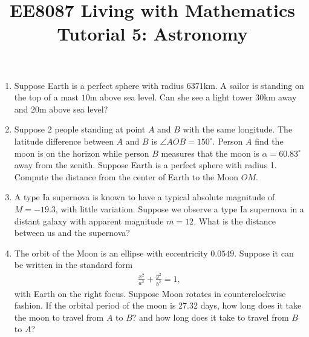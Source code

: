 \documentclass{article}
\title{EE8087 Living with Mathematics\\Tutorial 5: Astronomy}
\date{}
\begin{document}
 \maketitle
\begin{enumerate}
\item Suppose Earth is a perfect sphere with radius $6371$km. A sailor is standing on the top of a mast $10$m above sea level. Can she see a light tower $30$km away and $20$m above sea level?


\item Suppose 2 people standing at point $A$ and $B$ with the same longitude. The latitude difference between $A$ and $B$ is $\angle AOB = 150^\circ$. Person $A$ find the moon is on the horizon while person $B$ measures that the moon is $\alpha = 60.83^\circ$ away from the zenith. Suppose Earth is a perfect sphere with radius 1. Compute the distance from the center of Earth to the Moon $OM$.
\begin{figure}[ht]
  \centering
\end{figure}
\item A type Ia supernova is known to have a typical absolute magnitude of $M = -19.3$, with little variation. Suppose we observe a type Ia supernova in a distant galaxy with apparent magnitude $m=12$. What is the distance between us and the supernova?
\item  The orbit of the Moon is an ellipse with eccentricity $0.0549$. Suppose it can be written in the standard form
  \begin{align*}
    \frac{x^2}{a^2}+\frac{y^2}{b^2} = 1,
  \end{align*}
   with Earth on the right focus. Suppose Moon rotates in counterclockwise fashion. If the orbital period of the moon is 27.32 days, how long does it take the moon to travel from $A$ to $B$? and how long does it take to travel from $B$ to $A$?

  \begin{figure}[ht]
    \centering
\end{figure}
\end{enumerate}
\end{document}
